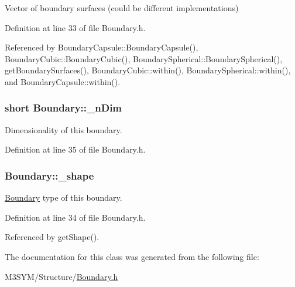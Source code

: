 Vector of boundary surfaces (could be different implementations) 



Definition at line 33 of file Boundary.\+h.



Referenced by Boundary\+Capsule\+::\+Boundary\+Capsule(), Boundary\+Cubic\+::\+Boundary\+Cubic(), Boundary\+Spherical\+::\+Boundary\+Spherical(), get\+Boundary\+Surfaces(), Boundary\+Cubic\+::within(), Boundary\+Spherical\+::within(), and Boundary\+Capsule\+::within().

\hypertarget{classBoundary_a96f2294e0c822ab216fe5ab7e17258c7}{
\subsubsection[{\+\_\+n\+Dim}]{\setlength{\rightskip}{0pt plus 5cm}short Boundary\+::\+\_\+n\+Dim\hspace{0.3cm}{\ttfamily [protected]}}}\label{classBoundary_a96f2294e0c822ab216fe5ab7e17258c7}


Dimensionality of this boundary. 



Definition at line 35 of file Boundary.\+h.

\hypertarget{classBoundary_a04c10c9a7aea1924d779d392e29f94ff}{
\subsubsection[{\+\_\+shape}]{ Boundary\+::\+\_\+shape\hspace{0.3cm}{\ttfamily [protected]}}}\label{classBoundary_a04c10c9a7aea1924d779d392e29f94ff}


\hyperlink{classBoundary}{Boundary} type of this boundary. 



Definition at line 34 of file Boundary.\+h.



Referenced by get\+Shape().



The documentation for this class was generated from the following file\+:\begin{DoxyCompactItemize}
\item 
M3\+S\+Y\+M/\+Structure/\hyperlink{Boundary_8h}{Boundary.\+h}\end{DoxyCompactItemize}
